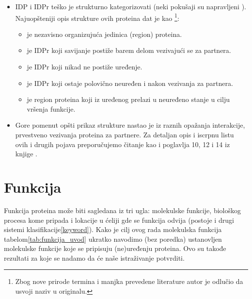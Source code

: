 \begin{itemize}
  \item 
    IDP i IDPr teško je strukturno kategorizovati \parencite{dunker2001,
      oldfield20014}(neki pokušaji su napravljeni \parencite{dunker2001}).
      Najuopšteniji opis strukture ovih proteina dat je kao
      \footnote{ Zbog nove
        prirode termina i manjka prevedene literature autor je odlučio da
      usvoji naziv u originalu.}\parencite{uversky2016}:
    \begin{itemize}
      \item {}  je nezavisno organizujuća jedinica (region) proteina.
      \item {}  je IDPr koji savijanje postiže barem delom vezivajući se za partnera. 
      \item {}  je IDPr koji nikad ne postiže uređenje.
      \item {}  je IDPr koji ostaje polovično neuređen i nakon vezivanja za partnera.
      \item {}  je region proteina koji iz uređenog prelazi u neuređeno stanje u cilju vršenja funkcije.
    \end{itemize}

  \item 
    Gore pomenut opšti prikaz strukture nastao je iz raznih opažanja
    interakcije, prvestveno vezivanja proteina za partnere. Za detaljan opis i
    iscrpnu listu ovih i drugih pojava preporučujemo čitanje \parencite{a2z,
    uversky2016} kao i poglavlja 10, 12 i 14 iz knjige .

\end{itemize}

\section{Funkcija}
Funkcija proteina može biti sagledana iz tri ugla: molekulske funkcije,
biološkog procesa kome pripada i lokacije u ćeliji gde se funkcija odvija
\parencite{go2000}(postoje i drugi sistemi klasifikacije\ref{keyword}).  Kako
je cilj ovog rada molekulska funkcija tabelom\ref{tab:funkcija_uvod} ukratko
navodimo (bez poredka) ustanovljen\parencite{Xie2007} molekulske funkcije koje
se pripisuju (ne)uređenju proteina. Ovo su takođe rezultati za koje se nadamo
da će naše istraživanje potvrditi.

